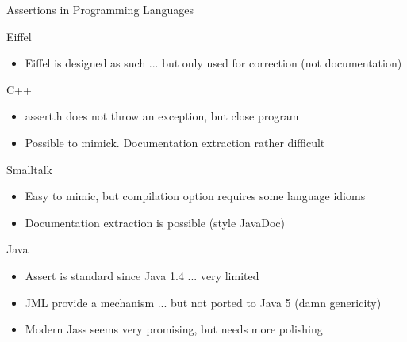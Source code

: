\begin{frame}{Assertions in Programming Languages}
  \begin{block}{Eiffel}
    \begin{itemize}
    \item Eiffel is designed as such ... but only used for correction (not documentation)
    \end{itemize}
  \end{block}

  \begin{block}{C++}
    \begin{itemize}
    \item assert.h does not throw an exception, but close program
    \item Possible to mimick. Documentation extraction rather difficult
    \end{itemize}
  \end{block}

  \begin{block}{Smalltalk}
    \begin{itemize}
    \item Easy to mimic, but compilation option requires some language idioms
    \item Documentation extraction is possible (style JavaDoc)
    \end{itemize}
  \end{block}

  \begin{block}{Java}
    \begin{itemize}
    \item Assert is standard since Java 1.4 ... very limited
    \item JML provide a mechanism ... but not ported to Java 5 (damn
      genericity)
    \item Modern Jass seems very promising, but needs more polishing
    \end{itemize}
  \end{block}
\end{frame}
